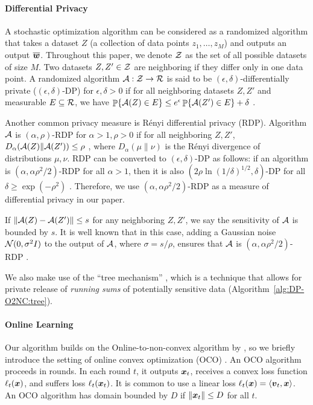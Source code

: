\paragraph{Differential Privacy}

A stochastic optimization algorithm can be considered as a randomized algorithm that takes a dataset $Z$ (a collection of data points $z_1,\ldots,z_M$) and outputs an output $\overline {{\boldsymbol{w}}}$. Throughout this paper, we denote ${\cal Z}$ as the set of all possible datasets of size $M$.
Two datasets $Z,Z'\in{\cal Z}$ are neighboring if they differ only in one data point. A randomized algorithm ${\cal A}:{\cal Z}\to{\cal R}$ is said to be $(\epsilon,\delta)$-differentially private ($(\epsilon,\delta)$-DP) for $\epsilon,\delta>0$ if for all neighboring datasets $Z,Z'$ and measurable $E\subseteq {\cal R}$, we have $\mathop{\mathbb{P}}\{{\cal A}(Z) \in E\} \le e^\epsilon\mathop{\mathbb{P}}\{{\cal A}(Z') \in E\} + \delta$ \citep{dwork2006calibrating}. 

Another common privacy measure is R\'enyi differential privacy (RDP). Algorithm ${\cal A}$ is $(\alpha,\rho)$-RDP for $\alpha>1,\rho>0$ if for all neighboring $Z,Z'$, $D_\alpha({\cal A}(Z)\|{\cal A}(Z')) \le \rho$ \citep{mironov2017renyi}, where $D_\alpha(\mu\|\nu)$ is the R\'enyi divergence of distributions $\mu,\nu$. 
RDP can be converted to $(\epsilon,\delta)$-DP as follows: if an algorithm is $(\alpha,\alpha\rho^2/2)$-RDP for all $\alpha>1$, then it is also $(2\rho\ln(1/\delta)^{1/2}, \delta)$-DP for all $\delta\ge \exp(-\rho^2)$ \citep[Proposition 3]{mironov2017renyi}. Therefore, we use $(\alpha,\alpha\rho^2/2)$-RDP as a measure of differential privacy in our paper.

If $\|{\cal A}(Z)-{\cal A}(Z')\| \le s$ for any neighboring $Z,Z'$, we say the sensitivity of ${\cal A}$ is bounded by $s$. It is well known that in this case, adding a Gaussian noise ${\cal N}(0,\sigma^2I)$ to the output of ${\cal A}$, where $\sigma=s/\rho$, ensures that ${\cal A}$ is $(\alpha,\alpha\rho^2/2)$-RDP \citep{mironov2017renyi}.

We also make use of the ``tree mechanism'' \cite{dwork2010differential, chan2011private}, which is a technique that allows for private release of \emph{running sums} of potentially sensitive data (Algorithm~\ref{alg:DP-O2NC:tree}).


\paragraph{Online Learning}

Our algorithm builds on the Online-to-non-convex algorithm by \cite{cutkosky2023optimal}, so we briefly introduce the setting of online convex optimization (OCO) \citep{cesa2006prediction, hazan2019introduction, orabona2019modern}. An OCO algorithm proceeds in rounds. In each round $t$, it outputs ${\boldsymbol{x}}_t$, receives a convex loss function $\ell_t({\boldsymbol{x}})$, and suffers loss $\ell_t({\boldsymbol{x}}_t)$. It is common to use a linear loss $\ell_t({\boldsymbol{x}}) = \langle {\boldsymbol{v}}_t,{\boldsymbol{x}} \rangle$. An OCO algorithm has domain bounded by $D$ if $\|{\boldsymbol{x}}_t\|\le D$ for all $t$.

